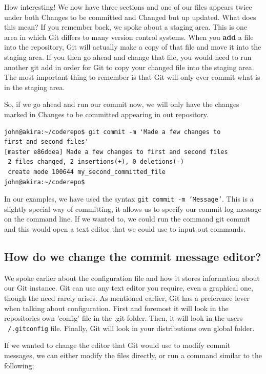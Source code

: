 How interesting!  We now have three sections and one of our files appears twice under both Changes to be committed and Changed but up updated.  What does this mean?  If you remember back, we spoke about a staging area.  This is one area in which Git differs to many version control systems.  When you \textbf{add} a file into the repository, Git will actually make a copy of that file and move it into the staging area.  If you then go ahead and change that file, you would need to run another git add in order for Git to copy your changed file into the staging area.  The most important thing to remember is that Git will only ever commit what is in the staging area.

So, if we go ahead and run our commit now, we will only have the changes marked in Changes to be committed appearing in out repository.  

\begin{Verbatim}[frame=single,fontsize=\relsize{-3}] 
john@akira:~/coderepo$ git commit -m 'Made a few changes to 
first and second files'
[master e86ddea] Made a few changes to first and second files
 2 files changed, 2 insertions(+), 0 deletions(-)
 create mode 100644 my_second_committed_file
john@akira:~/coderepo$ 
\end{Verbatim} 

In our examples, we have used the syntax \texttt{git commit -m 'Message'}.  This is a slightly special way of committing, it allows us to specify our commit log message on the command line.  If we wanted to, we could run the command git commit and this would open a text editor that we could use to input out commands.

\subsection{How do we change the commit message editor?}

We spoke earlier about the configuration file and how it stores information about our Git instance.  Git can use any text editor you require, even a graphical one, though the need rarely arises.  As mentioned earlier, Git has a preference lever when talking about configuration.  First and foremost it will look in the repositories own 'config' file in the .git folder.  Then, it will look in the users \texttt{~/.gitconfig} file.  Finally, Git will look in your distributions own global folder.  

If we wanted to change the editor that Git would use to modify commit messages, we can either modify the files directly, or run a command similar to the following;

